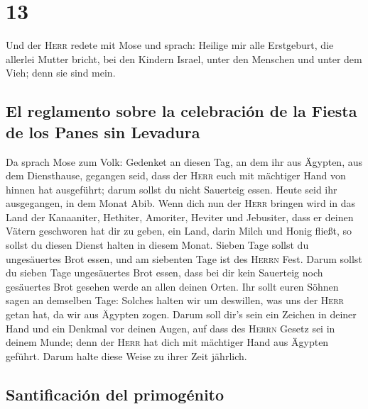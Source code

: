 \hypertarget{section-12}{%
\section{13}\label{section-12}}

 Und der \textsc{Herr} redete mit Mose und sprach:
 Heilige mir alle Erstgeburt, die allerlei Mutter bricht,
bei den Kindern Israel, unter den Menschen und unter dem Vieh; denn sie
sind mein.

\hypertarget{el-reglamento-sobre-la-celebraciuxf3n-de-la-fiesta-de-los-panes-sin-levadura}{%
\subsection{El reglamento sobre la celebración de la Fiesta de los Panes
sin
Levadura}\label{el-reglamento-sobre-la-celebraciuxf3n-de-la-fiesta-de-los-panes-sin-levadura}}

 Da sprach Mose zum Volk: Gedenket an diesen Tag, an dem
ihr aus Ägypten, aus dem Diensthause, gegangen seid, dass der
\textsc{Herr} euch mit mächtiger Hand von hinnen hat ausgeführt; darum
sollst du nicht Sauerteig essen.  Heute seid ihr
ausgegangen, in dem Monat Abib.  Wenn dich nun der
\textsc{Herr} bringen wird in das Land der Kanaaniter, Hethiter,
Amoriter, Heviter und Jebusiter, dass er deinen Vätern geschworen hat
dir zu geben, ein Land, darin Milch und Honig fließt, so sollst du
diesen Dienst halten in diesem Monat.  Sieben Tage sollst
du ungesäuertes Brot essen, und am siebenten Tage ist des \textsc{Herrn}
Fest.  Darum sollst du sieben Tage ungesäuertes Brot
essen, dass bei dir kein Sauerteig noch gesäuertes Brot gesehen werde an
allen deinen Orten.  Ihr sollt euren Söhnen sagen an
demselben Tage: Solches halten wir um deswillen, was uns der
\textsc{Herr} getan hat, da wir aus Ägypten zogen.  Darum
soll dir's sein ein Zeichen in deiner Hand und ein Denkmal vor deinen
Augen, auf dass des \textsc{Herrn} Gesetz sei in deinem Munde; denn der
\textsc{Herr} hat dich mit mächtiger Hand aus Ägypten geführt.
 Darum halte diese Weise zu ihrer Zeit jährlich.

\hypertarget{santificaciuxf3n-del-primoguxe9nito}{%
\subsection{Santificación del
primogénito}\label{santificaciuxf3n-del-primoguxe9nito}}

